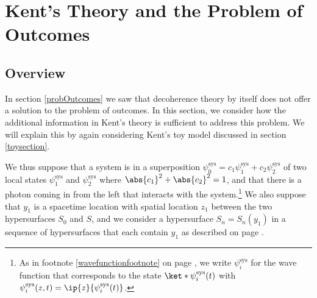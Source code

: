 \documentclass[12pt]{report}
\begin{document}



\section{Kent's Theory\label{Kentdecoherencesection} and the Problem of Outcomes}
\subsection{Overview}
In section \ref{probOutcomes} we saw that decoherence theory by itself does not offer a solution to the problem of outcomes. In this section, we consider how the additional information in Kent's theory is sufficient to address this problem. We will explain this by again considering  Kent's toy model discussed in section \ref{toysection}.

We thus suppose that a system is in a superposition $\psi_0^\text{sys} = c_1\psi_1^\text{sys}+c_2\psi_2^\text{sys}$ of two local states $\psi_1^\text{sys}$ and $\psi_2^\text{sys}$ where $\abs{c_1}^2+\abs{c_2}^2=1$, and that there is a photon coming in from the left that interacts with the system.\footnote{As in footnote \ref{wavefunctionfootnote} on page \pageref{wavefunctionfootnote}, we write $\psi_i^\text{sys}$ for the wave function that corresponds to the state $\ket*{\psi_i^\text{sys}(t)}$ with $\psi_i^\text{sys}(z, t)=\ip{z}{\psi_i^\text{sys}(t)}$.} We also suppose that  $y_1$ is a spacetime location with spatial location $z_1$ between the two hypersurfaces $S_0$ and $S$, and we consider a hypersurface $S_n=S_n(y_1)$  in a sequence of hypersurfaces that each contain $y_1$ as described on page \pageref{siydef}.  
\end{document}
